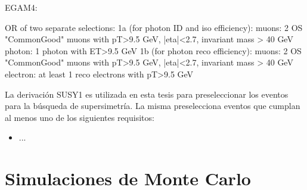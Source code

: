 EGAM4:

    OR of two separate selections:
        1a (for photon ID and iso efficiency):
            muons: 2 OS "CommonGood" muons with pT>9.5 GeV, |eta|<2.7, invariant mass > 40 GeV
            photon: 1 photon with ET>9.5 GeV 
        1b (for photon reco efficiency):
            muons: 2 OS "CommonGood" muons with pT>9.5 GeV, |eta|<2.7, invariant mass > 40 GeV
            electron: at least 1 reco electrons with pT>9.5 GeV 

La derivación SUSY1 es utilizada en esta tesis para preseleccionar los eventos para la búsqueda de supersimetría. La misma preselecciona eventos que cumplan al menos uno de los siguientes requisitos:

\begin{itemize}
  \item ...
\end{itemize}


\section{Simulaciones de Monte Carlo}

